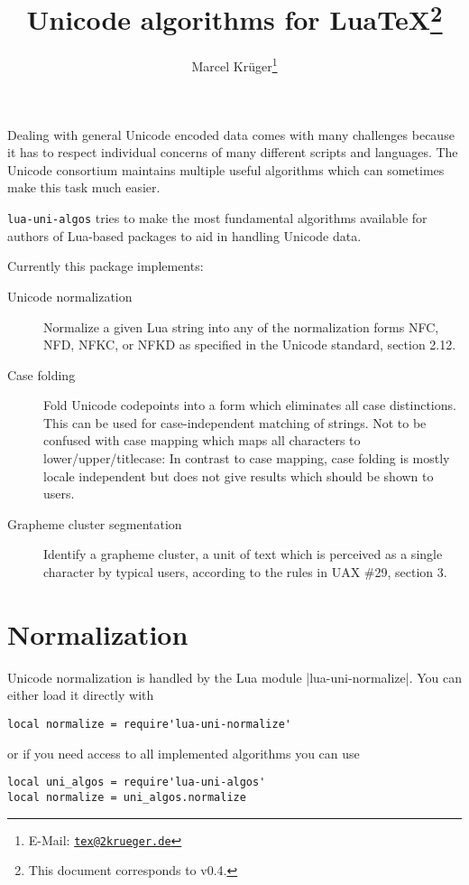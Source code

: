 \documentclass{article}
\title{Unicode algorithms for Lua\TeX\thanks{This document corresponds to \pkg{lua-uni-algos} v0.4.}}
\author{Marcel Krüger\thanks{E-Mail: \href{mailto:tex@2krueger.de}{\nolinkurl{tex@2krueger.de}}}}
\newcommand\pkg{\texttt}
\begin{document}
\maketitle
Dealing with general Unicode encoded data comes with many challenges because it has to respect individual concerns of many different scripts and languages. The Unicode consortium maintains multiple useful algorithms which can sometimes make this task much easier.

\pkg{lua-uni-algos} tries to make the most fundamental algorithms available for authors of Lua-based packages to aid in handling Unicode data.

Currently this package implements:
\begin{description}
  \item[Unicode normalization] Normalize a given Lua string into any of the normalization forms NFC, NFD, NFKC, or NFKD as specified in the Unicode standard, section 2.12.
  \item[Case folding] Fold Unicode codepoints into a form which eliminates all case distinctions. This can be used for case-independent matching of strings. Not to be confused with case mapping which maps all characters to lower/upper/titlecase: In contrast to case mapping, case folding is mostly locale independent but does not give results which should be shown to users.
  \item[Grapheme cluster segmentation] Identify a grapheme cluster, a unit of text which is perceived as a single character by typical users, according to the rules in UAX \#29, section 3.
\end{description}
\section{Normalization}
Unicode normalization is handled by the Lua module |lua-uni-normalize|.
You can either load it directly with
\begin{verbatim}
local normalize = require'lua-uni-normalize'
\end{verbatim}
or if you need access to all implemented algorithms you can use
\begin{verbatim}
local uni_algos = require'lua-uni-algos'
local normalize = uni_algos.normalize
\end{verbatim}
\end{document}
